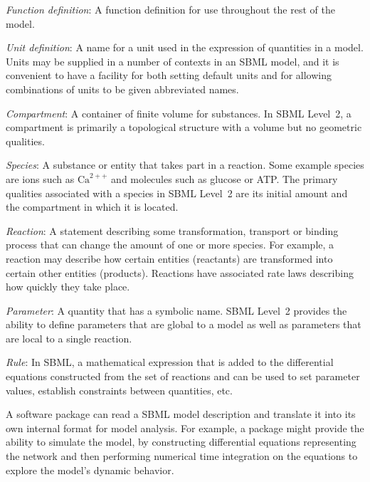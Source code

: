 \documentclass[10pt]{cekarticle}
\begin{document}
\begin{description}

\item \emph{Function definition}: A function definition for use
    throughout the rest of the model.

\item \emph{Unit definition}: A name for a unit used in the
expression of
  quantities in a model.  Units may be supplied in a number of contexts in
  an SBML model, and it is convenient to have a facility for both setting
  default units and for allowing combinations of units to be given
  abbreviated names.

\item \emph{Compartment}: A container of finite volume for substances. In
  SBML Level~2, a compartment is primarily a topological structure with a
  volume but no geometric qualities.

\item \emph{Species}: A substance or entity that takes part in a
reaction.
  Some example species are ions such as $\text{Ca}^{2++}$ and molecules
  such as glucose or ATP.  The primary qualities associated with a species
  in SBML Level~2 are its initial amount and the compartment in which it is
  located.

\item \emph{Reaction}: A statement describing some transformation,
  transport or binding process that can change the amount of one or more
  species.  For example, a reaction may describe how certain entities
  (reactants) are transformed into certain other entities (products).
  Reactions have associated rate laws describing how quickly they take
  place.

\item \emph{Parameter}: A quantity that has a symbolic name.  SBML
Level~2
  provides the ability to define parameters that are global to a model as
  well as parameters that are local to a single reaction.

\item \emph{Rule}: In SBML, a mathematical expression that is added
  to the differential equations constructed from the set of reactions and
  can be used to set parameter values, establish constraints between
  quantities, etc.

\end{description}

A software package can read a SBML model description and translate it
into its own internal format for model analysis.  For example, a package
might provide the ability to simulate the model, by constructing
differential equations representing the network and then performing
numerical time integration on the equations to explore the model's dynamic
behavior.
\end{document}
